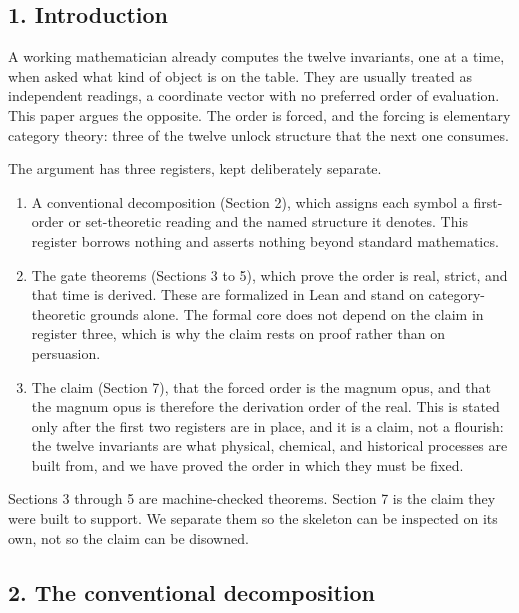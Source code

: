 \hypertarget{introduction}{%
\subsection{1. Introduction}\label{introduction}}

A working mathematician already computes the twelve invariants, one at a
time, when asked what kind of object is on the table. They are usually
treated as independent readings, a coordinate vector with no preferred
order of evaluation. This paper argues the opposite. The order is
forced, and the forcing is elementary category theory: three of the
twelve unlock structure that the next one consumes.

The argument has three registers, kept deliberately separate.

\begin{enumerate}
\def\labelenumi{\arabic{enumi}.}
\tightlist
\item
  A conventional decomposition (Section 2), which assigns each symbol a
  first-order or set-theoretic reading and the named structure it
  denotes. This register borrows nothing and asserts nothing beyond
  standard mathematics.
\item
  The gate theorems (Sections 3 to 5), which prove the order is real,
  strict, and that time is derived. These are formalized in Lean and
  stand on category-theoretic grounds alone. The formal core does not
  depend on the claim in register three, which is why the claim rests on
  proof rather than on persuasion.
\item
  The claim (Section 7), that the forced order is the magnum opus, and
  that the magnum opus is therefore the derivation order of the real.
  This is stated only after the first two registers are in place, and it
  is a claim, not a flourish: the twelve invariants are what physical,
  chemical, and historical processes are built from, and we have proved
  the order in which they must be fixed.
\end{enumerate}

Sections 3 through 5 are machine-checked theorems. Section 7 is the
claim they were built to support. We separate them so the skeleton can
be inspected on its own, not so the claim can be disowned.

\hypertarget{the-conventional-decomposition}{%
\subsection{2. The conventional
decomposition}\label{the-conventional-decomposition}}

